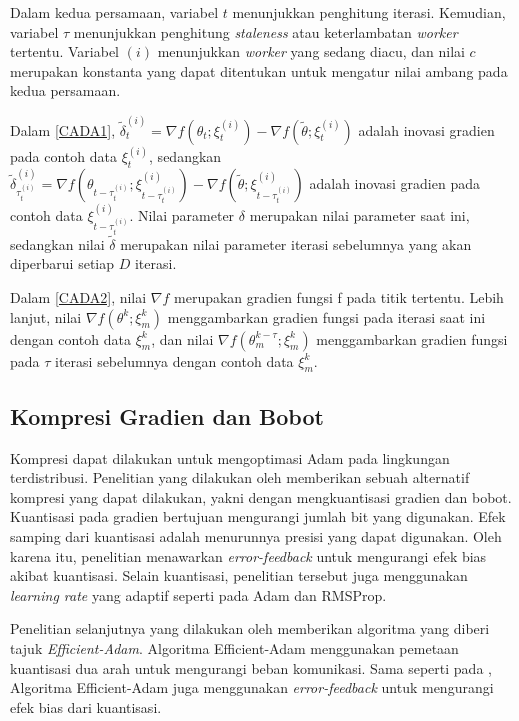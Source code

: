 Dalam kedua persamaan, variabel $t$ menunjukkan penghitung iterasi. Kemudian, variabel $\tau$ menunjukkan penghitung \emph{staleness} atau keterlambatan \emph{worker} tertentu. Variabel $(i)$ menunjukkan \emph{worker} yang sedang diacu, dan nilai $c$ merupakan konstanta yang dapat ditentukan untuk mengatur nilai ambang pada kedua persamaan.

Dalam \autoref{CADA1}, $\tilde{\delta}_t^{(i)} = \nabla f(\theta_t;\xi_t^{(i)}) - \nabla f(\tilde{\theta};\xi_t^{(i)})$ adalah inovasi gradien pada contoh data $\xi_t^{(i)}$, sedangkan $\tilde{\delta}_{\tau_t^{(i)}}^{(i)} = \nabla f(\theta_{t-\tau_t^{(i)}};\xi_{t-\tau_t^{(i)}}^{(i)}) - \nabla f(\tilde{\theta};\xi_{t-\tau_t^{(i)}}^{(i)})$ adalah inovasi gradien pada contoh data $\xi_{t-\tau_t^{(i)}}^{(i)}$. Nilai parameter $\delta$ merupakan nilai parameter saat ini, sedangkan nilai $\tilde{\delta}$ merupakan nilai parameter iterasi sebelumnya yang akan diperbarui setiap $D$ iterasi.

Dalam \autoref{CADA2}, nilai $\nabla f$ merupakan gradien fungsi f pada titik tertentu. Lebih lanjut, nilai $\nabla f(\theta^k;\xi^k_m)$ menggambarkan gradien fungsi pada iterasi saat ini dengan contoh data $\xi^k_m$, dan nilai $\nabla f(\theta^{k-\tau}_m;\xi^k_m)$ menggambarkan gradien fungsi pada $\tau$ iterasi sebelumnya dengan contoh data $\xi^k_m$.

\subsection{Kompresi Gradien dan Bobot}
Kompresi dapat dilakukan untuk mengoptimasi Adam pada lingkungan terdistribusi. Penelitian yang dilakukan oleh \textcite{Chen2021CADA} memberikan sebuah alternatif kompresi yang dapat dilakukan, yakni dengan mengkuantisasi gradien dan bobot. Kuantisasi pada gradien bertujuan mengurangi jumlah bit yang digunakan. Efek samping dari kuantisasi adalah menurunnya presisi yang dapat digunakan. Oleh karena itu, penelitian \textcite{Chen2021CADA} menawarkan \emph{error-feedback} untuk mengurangi efek bias akibat kuantisasi. Selain kuantisasi, penelitian tersebut juga menggunakan \emph{learning rate} yang adaptif seperti pada Adam dan RMSProp.

Penelitian selanjutnya yang dilakukan oleh \textcite{Chen2022Efficient} memberikan algoritma yang diberi tajuk \emph{Efficient-Adam}. Algoritma Efficient-Adam menggunakan pemetaan kuantisasi dua arah untuk mengurangi beban komunikasi. Sama seperti pada \textcite{Chen2021CADA}, Algoritma Efficient-Adam juga menggunakan \emph{error-feedback} untuk mengurangi efek bias dari kuantisasi.


